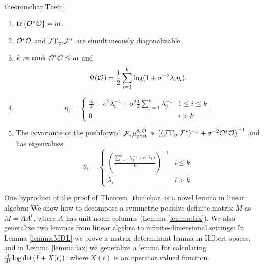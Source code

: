 \begin{restatable}{theorem}{char}
  Then:
  \begin{enumerate}
  \item  $\textup{tr}\left \{\mathcal{O}^*\mathcal{O} \right \} = m$.
  \item $\mathcal{O}^*\mathcal{O}$ and $\mathcal{F}\Gamma_{\textup{pr}}\mathcal{F}^*$ are simultaneously
    diagonalizable.
  \item $k := \textup{rank}\  \mathcal{O}^*\mathcal{O} \leq m$ and
    \begin{equation*}
      \tar(\obs) = \frac12 \sum_{i=1}^{k} \log (1 + \sigma^{-2}\lambda_i\eta_i). %
    \end{equation*}
  \item
    \begin{equation*}
        \eta_i = \begin{cases}
          \frac{m}{k} - \sigma^2 \lambda_i^{-1} + \sigma^2 \frac{1}{k} \sum_{j=1}^k \lambda_j^{-1} & 1 \leq i \leq k \\
          0 & i > k 
        \end{cases}.
    \end{equation*}
  \item The covariance of the pushforwad $\mathcal{F}_{*} \mu_{\textup{post}}^{\mathbf{d}, \mathcal{O}}$ is $\left (
    (\mathcal{F} \Gamma_{\textup{pr}} \mathcal{F}^*)^{-1} + \sigma^{-2} \mathcal{O}^*\mathcal{O} \right )^{-1}$
    and has eigenvalues
    \begin{equation*}
      \theta_i =
      \begin{cases}
        \left(\frac{\sum_{j=1}^k \lambda_j^{-1} + \sigma^{-2}m}{k} \right )^{-1} & i \leq k \\
        \lambda_i &  i > k 
      \end{cases}
    \end{equation*}
  \end{enumerate}
\end{restatable}

One byproduct of the proof of Theorem \ref{thm:char} is a novel lemma
in linear algebra: We show how to decompose a symmetric positive
definite matrix $M$ as $M = AA^t$, where $A$ has unit norm columns
(Lemma \ref{lemma:lax}). We also generalize two lemmas from linear
algebra to infinite-dimensional settings: In Lemma \ref{lemma:MDL} we
prove a matrix determinant lemma in Hilbert spaces, and in Lemma
\ref{lemma:lax} we generalize a lemma \cite{Lax07} for calculating
$\frac{\text{\textup{d}}}{\text{\textup{d}} t} \log \det (I + X(t))$, where $X(t)$ is an
operator valued function.

